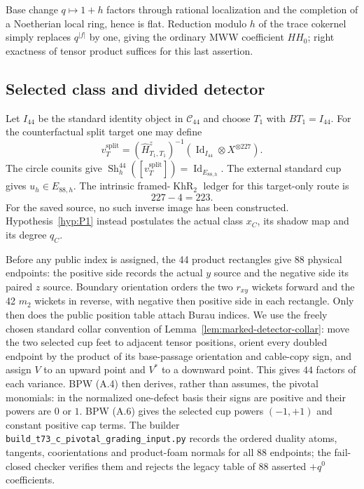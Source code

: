 \documentclass[11pt]{amsart}
\theoremstyle{definition}
\theoremstyle{remark}
\newcommand{\KhR}{\operatorname{KhR}}
\begin{document}
Base change $q\mapsto1+h$ factors through rational localization and the
completion of a Noetherian local ring, hence is flat.  Reduction modulo $h$
of the trace cokernel simply replaces $q^{|f|}$ by one, giving the ordinary
MWW coefficient $HH_0$; right exactness of tensor product suffices for this
last assertion.

\subsection{Selected class and divided detector}

Let $I_{44}$ be the standard identity object in $\mathcal C_{44}$ and choose
$T_1$ with $BT_1=I_{44}$.  For the counterfactual split target one may define
\[
v_T^{\mathrm{split}}=(\widehat H^z_{T_1,T_1})^{-1}
  (\operatorname{Id}_{I_{44}}\otimes X^{\otimes227}).
\]
The circle counits give
$\operatorname{Sh}^{44}_h([v_T^{\mathrm{split}}])=\operatorname{Id}_{E_{88,h}}$.
The external standard cup gives $u_h\in E_{88,h}$.  The intrinsic
framed-$\KhR_2$ ledger for this target-only route is
\[
227-4=223.
\]
For the saved source, no such inverse image has been constructed.
Hypothesis~\ref{hyp:P1} instead postulates the actual class $x_C$, its shadow
map and its degree $q_C$.

Before any public index is assigned, the 44 product rectangles give
88 physical endpoints: the positive side records the actual $y$ source and
the negative side its paired $z$ source.  Boundary orientation orders the two
$r_{xy}$ wickets forward and the 42 $m_2$ wickets in reverse, with negative
then positive side in each rectangle.  Only then does the public position
table attach Burau indices.  We use the freely chosen standard collar
convention of Lemma~\ref{lem:marked-detector-collar}: move the two selected
cup feet to adjacent tensor positions, orient every doubled endpoint by the
product of its base-passage orientation and cable-copy sign, and assign $V$
to an upward point and $V^*$ to a downward point.  This gives $44$ factors of
each variance.  BPW (A.4) then derives, rather than assumes, the pivotal
monomials: in the normalized one-defect basis their signs are positive and
their powers are $0$ or $1$.  BPW (A.6) gives the selected cup powers
$(-1,+1)$ and constant positive cap terms.  The builder
\texttt{build\_t73\_c\_pivotal\_grading\_input.py} records the ordered
duality atoms, tangents, coorientations and product-foam normals for all 88
endpoints; the fail-closed checker verifies them and rejects the legacy table
of 88 asserted $+q^0$ coefficients.
\end{document}
